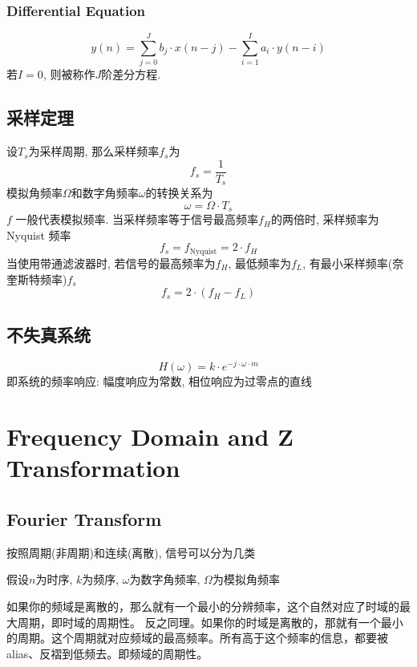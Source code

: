 \documentclass[a4paper]{report}
\begin{document}
\subsection{Differential Equation}
\begin{equation}
  y(n)=\displaystyle\sum_{j=0}^{J}b_j\cdot x(n-j)-\displaystyle\sum_{i=1}^{I} a_i\cdot y(n-i)
\end{equation}
若$I=0$, 则被称作$J$阶差分方程. 
\section{采样定理}
设$T_s$为采样周期, 那么采样频率$f_s$为
\begin{equation}
  f_s=\frac{1}{T_s}
\end{equation}
模拟角频率$\Omega$和数字角频率$\omega$的转换关系为
\begin{equation}
  \omega=\Omega\cdot T_s
\end{equation}
$f$ 一般代表模拟频率. 当采样频率等于信号最高频率$f_H$的两倍时, 采样频率为 Nyquist 频率
\begin{equation}
  f_s=f_{\text{Nyquist}}=2\cdot f_H
\end{equation}
当使用带通滤波器时, 若信号的最高频率为$f_H$, 最低频率为$f_L$, 有最小采样频率(奈奎斯特频率)$f_s$
\begin{equation}
  f_{s}=2\cdot (f_H-f_L)
\end{equation}
\section{不失真系统}
\begin{equation}
  H(\omega)=k\cdot e^{-j\cdot \omega\cdot m}
\end{equation}
即系统的频率响应: 幅度响应为常数, 相位响应为过零点的直线
\chapter{Frequency Domain and Z Transformation}
\section{Fourier Transform}
按照周期(非周期)和连续(离散), 信号可以分为几类

假设$n$为时序, $k$为频序, $\omega$为数字角频率, $\Omega$为模拟角频率

如果你的频域是离散的，那么就有一个最小的分辨频率，这个自然对应了时域的最大周期，即时域的周期性。
反之同理。如果你的时域是离散的，那就有一个最小的周期。这个周期就对应频域的最高频率。所有高于这个频率的信息，都要被alias、反褶到低频去。即频域的周期性。
\end{document}
